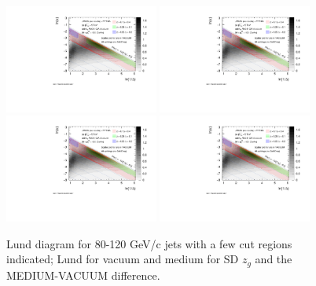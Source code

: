 \begin{figure}[htbp]
	\centering
	\includegraphics[width=0.45\textwidth,page=1]{figures/lund/lund_zg}
	\includegraphics[width=0.45\textwidth,page=2]{figures/lund/lund_zg}
	\includegraphics[width=0.45\textwidth,page=3]{figures/lund/lund_zg}
	\includegraphics[width=0.45\textwidth,page=4]{figures/lund/lund_zg}
	\caption{Lund diagram for 80-120 GeV/c jets with a few cut regions indicated; Lund for vacuum and medium for SD $z_{g}$ and the MEDIUM-VACUUM difference.}
	\label{fig:Lund_zg_lowpt}
\end{figure}

